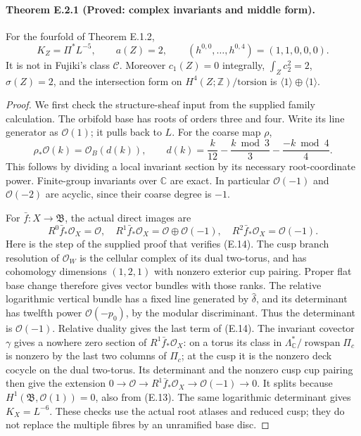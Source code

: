 

\paragraph{Theorem E.2.1 (Proved: complex invariants and middle form).}
For the fourfold of Theorem E.1.2,
\[
 K_Z=\Pi^*L^{-5},\qquad a(Z)=2,\qquad
 (h^{0,0},\ldots,h^{0,4})=(1,1,0,0,0).
 \tag{E.12}
\]
It is not in Fujiki's class $\mathcal C$.  Moreover
$c_1(Z)=0$ integrally, $\int_Zc_2^2=2$, $\sigma(Z)=2$, and
the intersection form on $H^4(Z;\mathbb Z)/\mathrm{torsion}$ is
$\langle1\rangle\oplus\langle1\rangle$.

\begin{proof}
We first check the structure-sheaf input from the supplied family
calculation.  The orbifold base has roots of orders three and four.
Write its line generator as $\mathcal O(1)$; it pulls back to $L$.
For the coarse map $\rho$,
\[
 \rho_*\mathcal O(k)=\mathcal O_B(d(k)),\qquad
 d(k)=\frac{k}{12}-\frac{k\bmod3}{3}
                    -\frac{-k\bmod4}{4}.
 \tag{E.13}
\]
This follows by dividing a local invariant section by its necessary
root-coordinate power.  Finite-group invariants over $\mathbb C$
are exact.  In particular $\mathcal O(-1)$ and $\mathcal O(-2)$
are acyclic, since their coarse degree is $-1$.

For $\bar f:X\to\mathfrak B$, the actual direct images are
\[
 R^0\bar f_*\mathcal O_X=\mathcal O,\quad
 R^1\bar f_*\mathcal O_X=\mathcal O\oplus\mathcal O(-1),
 \quad R^2\bar f_*\mathcal O_X=\mathcal O(-1).
 \tag{E.14}
\]
Here is the step of the supplied proof that verifies (E.14).
The cusp branch resolution of $\mathcal O_W$ is the cellular
complex of its dual two-torus, and has cohomology dimensions
$(1,2,1)$ with nonzero exterior cup pairing.  Proper flat base
change therefore gives vector bundles with those ranks.  The
relative logarithmic vertical bundle has a fixed line generated
by $\widehat\delta$, and its determinant has twelfth power
$\mathcal O(-p_0)$, by the modular discriminant.  Thus the
determinant is $\mathcal O(-1)$.  Relative duality gives the last
term of (E.14).  The invariant covector $\gamma$ gives a nowhere
zero section of $R^1\bar f_*\mathcal O_X$: on a torus its class
in $\Lambda^*_{\mathbb C}/\operatorname{rowspan}\Pi_c$ is
nonzero by the last two columns of $\Pi_c$; at the cusp it is
the nonzero deck cocycle on the dual two-torus.  Its determinant
and the nonzero cusp cup pairing then give the extension
$0\to\mathcal O\to R^1\bar f_*\mathcal O_X
\to\mathcal O(-1)\to0$.  It splits because
$H^1(\mathfrak B,\mathcal O(1))=0$, also from (E.13).
The same logarithmic determinant gives $K_X=L^{-6}$.
These checks use the actual root atlases and reduced cusp; they
do not replace the multiple fibres by an unramified base disc.


\end{proof}
